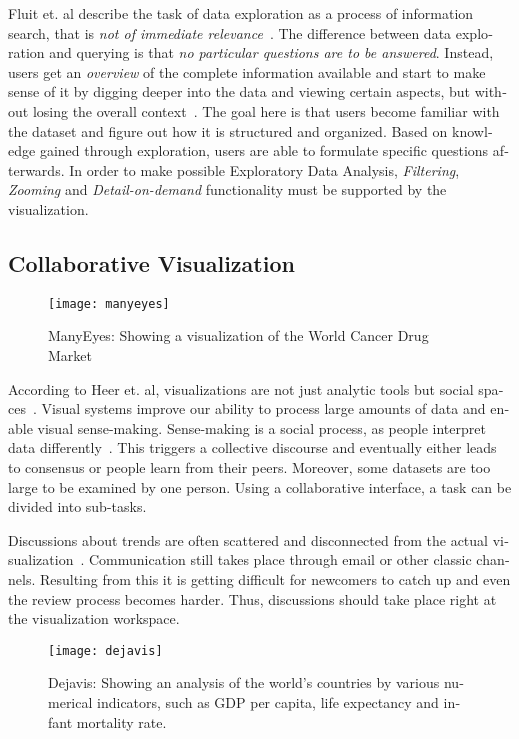 \begin{english}
Fluit et. al describe the task of data exploration as a process of information search, that is \emph{not of immediate relevance}~\cite{Fluit05}. The difference between data exploration and querying is that \emph{no particular questions are to be answered}. Instead, users get an \emph{overview} of the complete information available and start to make sense of it by digging deeper into the data and viewing certain aspects, but without losing the overall context~\cite{keren1993handbook}. The goal here is that users become familiar with the dataset and figure out how it is structured and organized. Based on knowledge gained through exploration, users are able to formulate specific questions afterwards. In order to make possible Exploratory Data Analysis, \emph{Filtering}, \emph{Zooming} and \emph{Detail-on-demand} functionality must be supported by the visualization.

\subsection{Collaborative Visualization}

\begin{figure}
\centering
\texttt{[image: manyeyes]}
\caption{ManyEyes: Showing a visualization of the World Cancer Drug Market }
\label{fig:manyeyes}
\end{figure}

According to Heer et. al, visualizations are not just analytic tools but social spaces~\cite{voyagers-and-voyeurs,design-considerations-vast}. Visual systems improve our ability to process large amounts of data and enable visual sense-making. Sense-making is a social process, as people interpret data differently~\cite{card99}. This triggers a collective discourse and eventually either leads to consensus or people learn from their peers. Moreover, some datasets are too large to be examined by one person. Using a collaborative interface, a task can be divided into sub-tasks.

Discussions about trends are often scattered and disconnected from the actual visualization~\cite{voyagers-and-voyeurs}. Communication still takes place through email or other classic channels. Resulting from this it is getting difficult for newcomers to catch up and even the review process becomes harder. Thus, discussions should take place right at the visualization workspace.

\begin{figure}
\centering
\texttt{[image: dejavis]}
\caption{Dejavis: Showing an analysis of the world's countries by various numerical indicators, such as GDP per capita, life expectancy and infant mortality rate.}
\label{fig:dejavis}
\end{figure}


\end{english}
